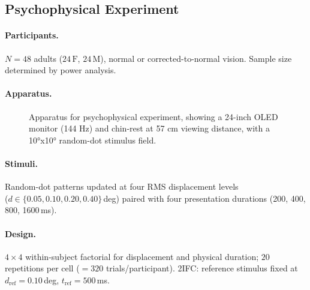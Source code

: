 \documentclass[preprint,11pt]{elsarticle}
\begin{document}
\subsection{Psychophysical Experiment}

\paragraph{Participants.}
$N=48$ adults ($24\,\mathrm{F}$, $24\,\mathrm{M}$), normal or
corrected-to-normal vision.  Sample size determined by power analysis.

\paragraph{Apparatus.}
\begin{figure}[ht]
\centering
{}
\caption{Apparatus for psychophysical experiment, showing a 24-inch OLED monitor (144 Hz) and chin-rest at 57 cm viewing distance, with a 10°x10° random-dot stimulus field.}
\label{fig:apparatus}
\end{figure}

\paragraph{Stimuli.}
Random-dot patterns updated at four RMS displacement levels \\
($d \in \{0.05,\allowbreak 0.10,\allowbreak 0.20,\allowbreak 0.40\}$\,deg) paired with four presentation durations (200, 400, 800, 1600\,ms).

\paragraph{Design.}
$4\times4$ within-subject factorial for displacement and physical
duration; $20$ repetitions per cell ($=320$ trials\slash participant).
2IFC: reference stimulus fixed at $d_{\mathrm{ref}}=0.10$\,deg,
$t_{\mathrm{ref}}=500$\,ms.
\end{document}

